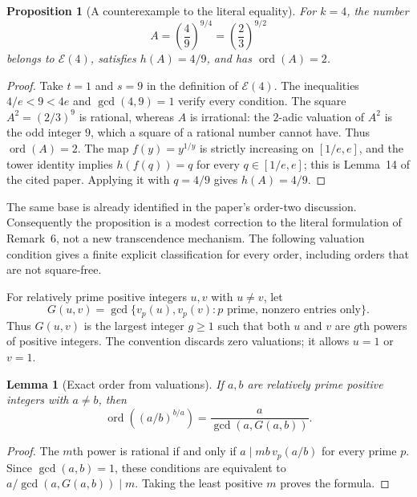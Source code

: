 \documentclass[11pt,a4paper]{article}
\newtheorem{lemma}[theorem]{Lemma}
\newtheorem{proposition}[theorem]{Proposition}
\theoremstyle{definition}
\theoremstyle{remark}
\numberwithin{equation}{section}
\begin{document}
\begin{proposition}[A counterexample to the literal equality]\label{sur:exp-counterexample}
For $k=4$, the number
\[
 A=\left(\frac49\right)^{9/4}
  =\left(\frac23\right)^{9/2}
\]
belongs to $\mathcal E(4)$, satisfies $h(A)=4/9$, and has
$\operatorname{ord}(A)=2$.
\end{proposition}
\begin{proof}
Take $t=1$ and $s=9$ in the definition of $\mathcal E(4)$.
The inequalities $4/e<9<4e$ and $\gcd(4,9)=1$ verify every condition.
The square $A^2=(2/3)^9$ is rational, whereas $A$ is irrational:
the $2$-adic valuation of $A^2$ is the odd integer $9$, which a square
of a rational number cannot have. Thus $\operatorname{ord}(A)=2$.
The map $f(y)=y^{1/y}$ is strictly increasing on $[1/e,e]$,
and the tower identity implies $h(f(q))=q$ for every
$q\in[1/e,e]$; this is Lemma~14 of the cited paper.
Applying it with $q=4/9$ gives $h(A)=4/9$.
\end{proof}

The same base is already identified in the paper's order-two discussion.
Consequently the proposition is a modest correction to the literal
formulation of Remark~6, not a new transcendence mechanism.
The following valuation condition gives a finite explicit classification
for every order, including orders that are not square-free.

For relatively prime positive integers $u,v$ with $u\ne v$, let
\[
 G(u,v)=\gcd\{v_p(u),v_p(v):p\text{ prime, nonzero entries only}\}.
\]
Thus $G(u,v)$ is the largest integer $g\ge1$ such that both $u$ and $v$
are $g$th powers of positive integers. The convention discards zero
valuations; it allows $u=1$ or $v=1$.

\begin{lemma}[Exact order from valuations]\label{sur:exp-order-lemma}
If $a,b$ are relatively prime positive integers with $a\ne b$, then
\[
 \operatorname{ord}\!\left((a/b)^{b/a}\right)
  =\frac{a}{\gcd(a,G(a,b))}.
\]
\end{lemma}
\begin{proof}
The $m$th power is rational if and only if
$a\mid mb\,v_p(a/b)$ for every prime $p$.
Since $\gcd(a,b)=1$, these conditions are equivalent to
$a/\gcd(a,G(a,b))\mid m$.
Taking the least positive $m$ proves the formula.
\end{proof}
\end{document}
